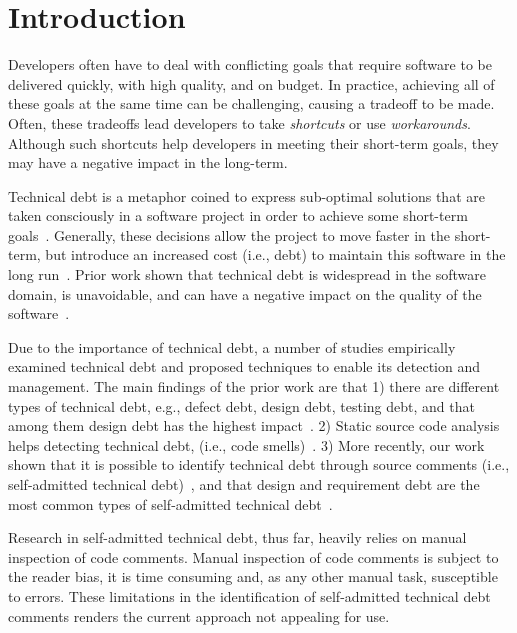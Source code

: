 \documentclass{sig-alternate}
\newcommand{\SATD}{self-admitted technical debt\xspace}
\begin{document}
\terms{}

\keywords{}

\section{Introduction}
\label{sec:introduction}
Developers often have to deal with conflicting goals that require software to be delivered quickly, with high quality, and on budget. In practice, achieving all of these goals at the same time can be challenging, causing a tradeoff to be made. Often, these tradeoffs lead developers to take \emph{shortcuts} or use \emph{workarounds}. Although such shortcuts help developers in meeting their short-term goals, they may have a negative impact in the long-term.

Technical debt is a metaphor coined to express sub-optimal solutions that are taken consciously in a software project in order to achieve some short-term goals~\cite{Cunningham1992WPM}. Generally, these decisions allow the project to move faster in the short-term, but introduce an increased cost (i.e., debt) to maintain this software in the long run~\cite{Seaman2011,Kruchten2013IWMTD}. Prior work shown that technical debt is widespread in the software domain, is unavoidable, and can have a negative impact on the quality of the software~\cite{Lim2012Software}.

Due to the importance of technical debt, a number of studies empirically examined technical debt and proposed techniques to enable its detection and management. The main findings of the prior work are that 1) there are different types of technical debt, e.g., defect debt, design debt, testing debt, and that among them design debt has the highest impact~\cite{Alves2014MTD,Marinescu2012IBM}. 2) Static source code analysis helps detecting technical debt, (i.e., code smells)~\cite{Marinescu2004ICSM,Marinescu2010CSMR,Zazworka2013CSE}. 3) More recently, our work shown that it is possible to identify technical debt through source comments (i.e., \SATD)~\cite{Potdar2014ICSME}, and that design and requirement debt are the most common types of \SATD~\cite{Maldonado2015MTD}.

Research in \SATD, thus far, heavily relies on manual inspection of code comments. Manual inspection of code comments is subject to the reader bias, it is time consuming and, as any other manual task, susceptible to errors. These limitations in the identification of \SATD comments renders the current approach not appealing for use.
\end{document}
